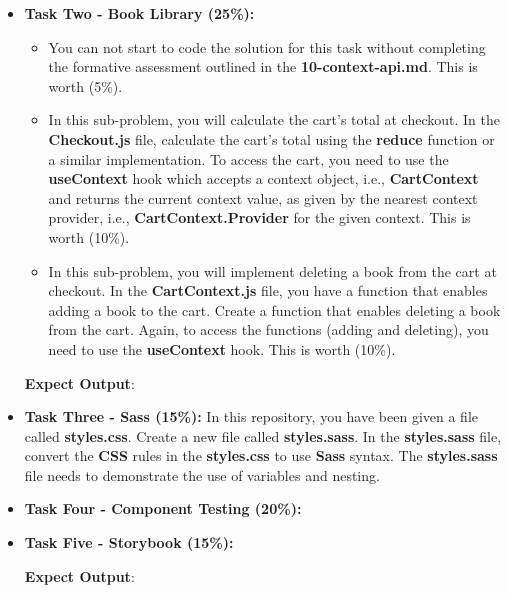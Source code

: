 \documentclass{article}
\begin{document}
\begin{itemize}
	\item \textbf{Task Two - Book Library (25\%):}
	      \begin{itemize}
	      	\item You can not start to code the solution for this task without completing the formative assessment outlined in the  \textbf{10-context-api.md}. This is worth (5\%).
	      	\item In this sub-problem, you will calculate the cart's total at checkout. In the \textbf{Checkout.js} file, calculate the cart's total using the \textbf{reduce} function or a similar implementation. To access the cart, you need to use the \textbf{useContext} hook which accepts a context object, i.e., \textbf{CartContext} and returns the current context value, as given by the nearest context provider, i.e., \textbf{CartContext.Provider} for the given context. This is worth (10\%).
	      	\item In this sub-problem, you will implement deleting a book from the cart at checkout. In the \textbf{CartContext.js} file, you have a function that enables adding a book to the cart. Create a function that enables deleting a book from the cart. Again, to access the functions (adding and deleting), you need to  use the \textbf{useContext} hook. This is worth (10\%).
	      \end{itemize}
	      \textbf{Expect Output}:
	\item \textbf{Task Three - Sass (15\%):} In this repository, you have been given a file called \textbf{styles.css}. Create a new file called \textbf{styles.sass}. In the \textbf{styles.sass} file, convert the \textbf{CSS} rules in the \textbf{styles.css} to use \textbf{Sass} syntax. The \textbf{styles.sass} file needs to demonstrate the use of variables and nesting.
	      
	\item \textbf{Task Four - Component Testing (20\%):}	
	\item \textbf{Task Five - Storybook (15\%):}		
	      
	      \textbf{Expect Output}:
\end{itemize}
\end{document}
